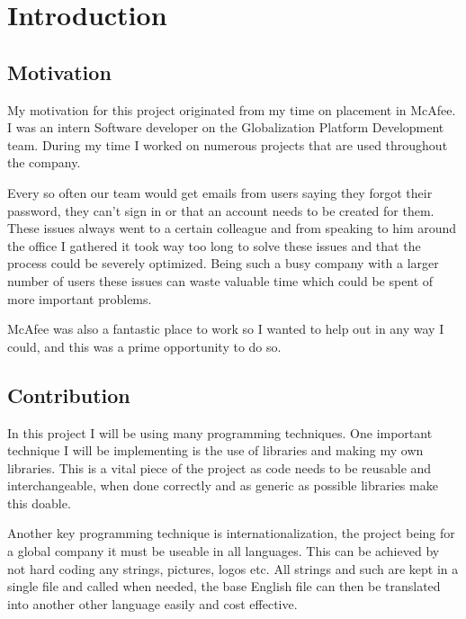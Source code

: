 \chapter{Introduction}
\label{chap:intro}

\section{Motivation}
My motivation for this project originated from my time on placement in McAfee. I was an intern Software developer on the Globalization Platform Development team. During my time I worked on numerous projects that are used throughout the company. 

Every so often our team would get emails from users saying they forgot their password, they can’t sign in or that an account needs to be created for them. These issues always went to a certain colleague and from speaking to him around the office I gathered it took way too long to solve these issues and that the process could be severely optimized.  Being such a busy company with a larger number of users these issues can waste valuable time which could be spent of more important problems. 

McAfee was also a fantastic place to work so I wanted to help out in any way I could, and this was a prime opportunity to do so.


\section{Contribution}
In this project I will be using many programming techniques. One important technique I will be implementing is the use of libraries and making my own libraries. This is a vital piece of the project as code needs to be reusable and interchangeable, when done correctly and as generic as possible libraries make this doable. 

 Another key programming technique is internationalization, the project being for a global company it must be useable in all languages. This can be achieved by not hard coding any strings, pictures, logos etc. All strings and such are kept in a single file and called when needed, the base English file can then be translated into another other language easily and cost effective.
 

